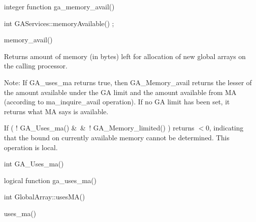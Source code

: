 \documentclass[12pt]{article}
\begin{document}
\begin{fapi}
\begin{fcode}
integer function ga_memory_avail()
\end{fcode}
\end{fapi}

\begin{cxxapi}
\begin{cxxcode}
int GAServices::memoryAvailable() ;
\end{cxxcode}
\end{cxxapi}

\begin{pyapi}
\begin{pycode}
memory_avail() 
\end{pycode}
\end{pyapi}


\begin{desc}

Returns amount of memory (in bytes) left for allocation of new global
arrays on the calling processor.

Note: If GA_uses_ma returns true, then GA_Memory_avail returns the lesser 
of the amount available under the GA limit and the amount available from MA 
(according to ma_inquire_avail operation). If no GA limit has been set, it 
returns what MA says is available.

If ( ! GA_Uses_ma() \&\ \&\ ! GA_Memory_limited() ) returns $< 0$, indicating 
that the bound on currently available memory cannot be determined.
This operation is local.
\end{desc}


\begin{capi}
\begin{ccode}
int GA_Uses_ma()
\end{ccode}
\end{capi}

\begin{fapi}
\begin{fcode}
logical function ga_uses_ma()
\end{fcode}
\end{fapi}

\begin{cxxapi}
\begin{cxxcode}
int GlobalArray::usesMA()
\end{cxxcode}
\end{cxxapi}

\begin{pyapi}
\begin{pycode}
uses_ma()
\end{pycode}
\end{pyapi} 
 
\end{document}
